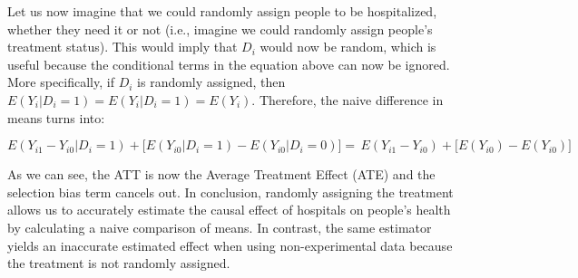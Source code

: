 \documentclass[12pt]{article}
\begin{document}
Let us now imagine that we could randomly assign people to be hospitalized,
whether they need it or not (i.e., imagine we could randomly assign people's
treatment status). This would imply that $D_i$ would now be random, which is
useful because the conditional terms in the equation above can now be ignored.
More specifically, if $D_i$ is randomly assigned, then
$E(Y_i | D_i = 1) = E(Y_i | D_i = 1) = E(Y_i)$. Therefore, the naive difference
in means turns into:

\begin{equation*}
    E(Y_{i1} - Y_{i0} | D_i = 1)
        + \big[ E(Y_{i0} | D_i = 1) - E(Y_{i0} | D_i = 0) \big]
        = \, E(Y_{i1} - Y_{i0}) + \big[ E(Y_{i0}) - E(Y_{i0}) \big]
\end{equation*}

As we can see, the ATT is now the Average Treatment Effect (ATE) and the
selection bias term cancels out. In conclusion, randomly assigning the
treatment allows us to accurately estimate the causal effect of hospitals on
people's health by calculating a naive comparison of means. In contrast, the
same estimator yields an inaccurate estimated effect when using
non-experimental data because the treatment is not randomly assigned.

\end{document}
